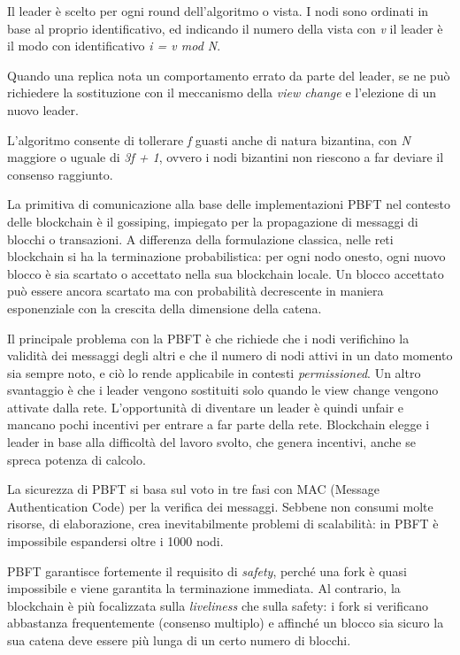 Il leader è scelto per ogni round dell'algoritmo o vista. I nodi sono ordinati in base al proprio identificativo, ed indicando il numero della vista con \textit{v} il leader è il modo con identificativo \textit{i = v mod N}.

Quando una replica nota un comportamento errato da parte del leader, se ne può richiedere la sostituzione con il meccanismo della \textit{view change} e l'elezione di un nuovo leader.

L'algoritmo consente di tollerare \textit{f} guasti anche di natura bizantina, con \textit{N} maggiore o uguale di \textit{3f + 1}, ovvero i nodi bizantini non riescono a far deviare il consenso raggiunto.

\vspace{5mm}

La primitiva di comunicazione alla base delle implementazioni PBFT nel contesto delle blockchain è il gossiping, impiegato per la propagazione di messaggi di blocchi o transazioni. A differenza della formulazione classica, nelle reti blockchain si ha la terminazione probabilistica: per ogni nodo onesto, ogni nuovo blocco è sia scartato o accettato nella sua blockchain locale. Un blocco accettato può essere ancora scartato ma con probabilità decrescente in maniera esponenziale con la crescita della dimensione della catena.

Il principale problema con la PBFT è che richiede che i nodi verifichino la validità dei messaggi degli altri e che il numero di nodi attivi in un dato momento sia sempre noto, e ciò lo rende applicabile in contesti \textit{permissioned}. Un altro svantaggio è che i leader vengono sostituiti solo quando le view change vengono attivate dalla rete. L'opportunità di diventare un leader è quindi unfair e mancano pochi incentivi per entrare a far parte della rete. Blockchain elegge i leader in base alla difficoltà del lavoro svolto, che genera incentivi, anche se spreca potenza di calcolo.

\vspace{5mm}

La sicurezza di PBFT si basa sul voto in tre fasi con MAC (Message Authentication Code) per la verifica dei messaggi. Sebbene non consumi molte risorse, di elaborazione, crea inevitabilmente problemi di scalabilità: in PBFT è impossibile espandersi oltre i 1000 nodi.

PBFT garantisce fortemente il requisito di \textit{safety}, perché una fork è quasi impossibile e viene garantita la terminazione immediata. Al contrario, la blockchain è più focalizzata sulla \textit{liveliness} che sulla safety: i fork si verificano abbastanza frequentemente (consenso multiplo) e affinché un blocco sia sicuro la sua catena deve essere più lunga di un certo numero di blocchi.

